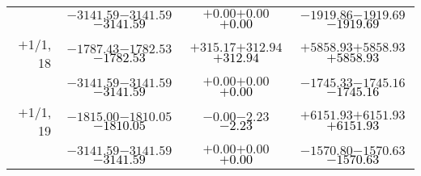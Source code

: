 \documentclass[compress]{beamer}
\begin{document}
\begin{frame}
{\begin{tabular}{r | c | c | c}
           & $-3141.59$\hspace{0.1 cm}$-3141.59$\hspace{0.1 cm}\textcolor{black}{$-3141.59$} & $+0.00$\hspace{0.1 cm}$+0.00$\hspace{0.1 cm}\textcolor{black}{$+0.00$} & $-1919.86$\hspace{0.1 cm}$-1919.69$\hspace{0.1 cm}\textcolor{black}{$-1919.69$} \\
$+$1/1, 18 & $-1787.43$\hspace{0.1 cm}$-1782.53$\hspace{0.1 cm}\textcolor{black}{$-1782.53$} & $+315.17$\hspace{0.1 cm}$+312.94$\hspace{0.1 cm}\textcolor{black}{$+312.94$} & $+5858.93$\hspace{0.1 cm}$+5858.93$\hspace{0.1 cm}\textcolor{black}{$+5858.93$} \\
           & $-3141.59$\hspace{0.1 cm}$-3141.59$\hspace{0.1 cm}\textcolor{black}{$-3141.59$} & $+0.00$\hspace{0.1 cm}$+0.00$\hspace{0.1 cm}\textcolor{black}{$+0.00$} & $-1745.33$\hspace{0.1 cm}$-1745.16$\hspace{0.1 cm}\textcolor{black}{$-1745.16$} \\
$+$1/1, 19 & $-1815.00$\hspace{0.1 cm}$-1810.05$\hspace{0.1 cm}\textcolor{black}{$-1810.05$} & $-0.00$\hspace{0.1 cm}$-2.23$\hspace{0.1 cm}\textcolor{black}{$-2.23$} & $+6151.93$\hspace{0.1 cm}$+6151.93$\hspace{0.1 cm}\textcolor{black}{$+6151.93$} \\
           & $-3141.59$\hspace{0.1 cm}$-3141.59$\hspace{0.1 cm}\textcolor{black}{$-3141.59$} & $+0.00$\hspace{0.1 cm}$+0.00$\hspace{0.1 cm}\textcolor{black}{$+0.00$} & $-1570.80$\hspace{0.1 cm}$-1570.63$\hspace{0.1 cm}\textcolor{black}{$-1570.63$} \\

\end{tabular}}
\end{frame}
\end{document}
